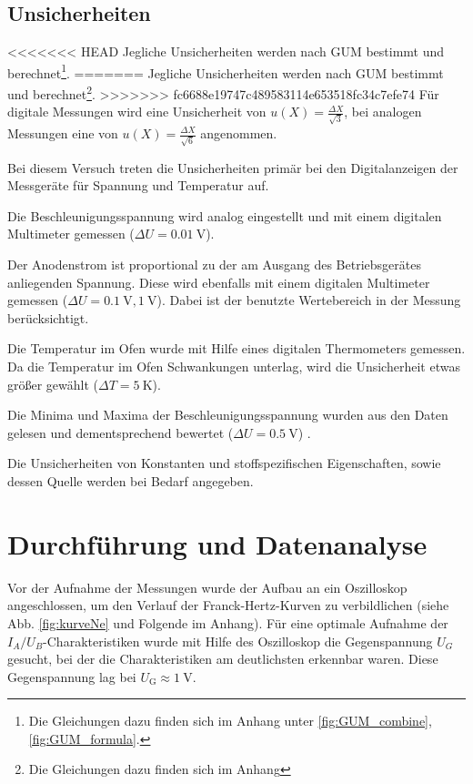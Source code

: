 	\subsection{Unsicherheiten}
	
<<<<<<< HEAD
		Jegliche Unsicherheiten werden nach GUM bestimmt und berechnet\footnote{Die Gleichungen dazu finden sich im Anhang unter \ref{fig:GUM_combine}, \ref{fig:GUM_formula}.}.
=======
		Jegliche Unsicherheiten werden nach GUM bestimmt und berechnet\footnote{Die Gleichungen dazu finden sich im Anhang}. 
>>>>>>> fc6688e19747c489583114e653518fc34c7efe74
		Für digitale Messungen wird eine Unsicherheit von $u(X) = \frac{\Delta X}{\sqrt{3}}$, bei analogen Messungen eine von $u(X) = \frac{\Delta X}{\sqrt{6}}$ angenommen.
	
		Bei diesem Versuch treten die Unsicherheiten primär bei den Digitalanzeigen der Messgeräte für Spannung und Temperatur auf.
	
		Die Beschleunigungsspannung wird analog eingestellt und mit einem digitalen Multimeter gemessen ($\Delta U = \SI{0.01}{\volt}$).
	
		Der Anodenstrom ist proportional zu der am Ausgang des Betriebsgerätes anliegenden Spannung.
		Diese wird ebenfalls mit einem digitalen Multimeter gemessen ($\Delta U = \SI{0.1}{\volt}, \SI{1}{\volt}$).
		Dabei ist der benutzte Wertebereich in der Messung berücksichtigt.
		
		Die Temperatur im Ofen wurde mit Hilfe eines digitalen Thermometers gemessen.
		Da die Temperatur im Ofen Schwankungen unterlag, wird die Unsicherheit etwas größer gewählt ($\Delta T = \SI{5}{\kelvin}$).
		
		Die Minima und Maxima der Beschleunigungsspannung wurden aus den Daten gelesen und dementsprechend bewertet ($\Delta U = \SI{0.5}{\volt}$) .
		
		Die Unsicherheiten von Konstanten und stoffspezifischen Eigenschaften, sowie dessen Quelle werden bei Bedarf angegeben.

\section{Durchführung und Datenanalyse}
	
	Vor der Aufnahme der Messungen wurde der Aufbau an ein Oszilloskop angeschlossen, um den Verlauf der Franck-Hertz-Kurven zu verbildlichen (siehe Abb. \ref{fig:kurveNe} und Folgende im Anhang).
	Für eine optimale Aufnahme der $I_A/U_B$-Charakteristiken wurde mit Hilfe des Oszilloskop die Gegenspannung $U_G$ gesucht, bei der die Charakteristiken am deutlichsten erkennbar waren.
	Diese Gegenspannung lag bei $ U_\text{G} \approx \SI{1}{\volt}$.
	

